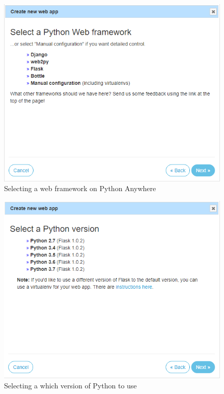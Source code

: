 \documentclass[10pt,a4paper]{article}
\begin{document}
\begin{figure}[H]
\centering
  \includegraphics[width=\linewidth]{images/webappframework.png}
  \caption{Selecting a web framework on Python Anywhere}
  \label{fig:picamera}
\end{figure}

\begin{figure}[H]
\centering
  \includegraphics[width=\linewidth]{images/webapppython.png}
  \caption{Selecting a which version of Python to use}
  \label{fig:picamera}
\end{figure}
\end{document}

